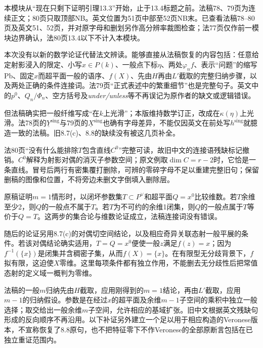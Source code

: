 
本模块从“现在只剩下证明引理13.3”开始，止于13.4标题之前。法稿78、79页为连续正文；80页只取顶部NB。英文位置为51页中部至52页NB末。已查看法稿78--80页及英文51、52页，并对原字母和删划另作高分辨率裁图检查；法77页仅作前一模块边界确认，法80页13.4以下不计入本模块。

本次没有以新的数学论证代替法文辨读。能够直接从法稿恢复的内容包括：任意给定射影浸入的限定、小写$x\in P(k)$、一般点下标$\eta$、两处$\varphi_n f$、表示“问题”的缩写Pb、固定$x$而超平面一般的语序、$f(X)$、先由$H$再由$L'$截取的完整归纳步骤，以及两处正确的条件连接词。法79页“正式表述中的繁重细节”也是完整句子。英文中的$p^0$、$Q_n/\Phi_n$、空方括号及\emph{under/unless}等不再误记为原作者的缺文或逻辑错误。

但法稿确实把一般纤维写成“在$k$上光滑”；本版维持数学订正，改成在$\kappa(\eta)$上光滑。法78页的$\underline Y^{\mathrm{sing}}$与79页的$\underline X^{\mathrm{sing}}$也确有字母差异，不能仅因英文在前处写$h^{\mathrm{sing}}$就臆造一致的法稿。旧8.7(c)、8.8的缺续没有被这几页补全。

法80页“没有什么能排除$T$包含直线$C^0$”完整可读，故旧中文的连接语残缺标记撤销。$C^0$解释为射影对偶的消灭子参数空间；原文例取$\dim C=r-2$时，它恰是一条直线。冒号后两行有密集覆打删除，可辨的零碎字母不足以重建完整旧句；保留删稿的图像和位置，不将旁边未删文字倒填入删除层。

原稿证明$m=1$情形时，以闭坏参数集$T\subset P^\vee$和超平面$Q=x^0$比较维数。若$T$余维至少2，则$Q$的一般点不属于$T$。若$T$为不可约的余维1闭集，则$Q$的一般点属于$T$等价于$Q=T$。这两步的集合论与维数论证成立，法稿连接词没有错误。

随后的论证另用8.7(c)的对偶切空间结论，以及相应奇异关联态射一般平展的条件。若该对偶结论确实适用，$T=Q=x^0$便使一般$z$满足$f(z)=x$；因为$f^{-1}(\{x\})$是闭集并含稠密子集，从而$f(X)=\{x\}$。在有限型无分歧背景下，$f$拟有限，这迫使$X$零维。这里每项条件都有独立作用，不能删去无分歧性后把常值态射的定义域一概判为零维。

法稿的一般$m$归纳先由$H$截取，应用刚得到的$m=1$结论，再由$L'$截取，应用$m-1$的归纳假设。参数是在经过$x$的超平面及余维$m-1$子空间的乘积中独立一般选择；取交给出一般余维$m$子空间，允许相应的基域扩张。旧中文根据英文残缺句形成的反向顺序不再沿用。以下补证另外建立一个足以用于相应构造的Veronese版本，不宣称恢复了8.8原句，也不把特征零下不作Veronese的全部原断言包括在已独立重证范围内。

